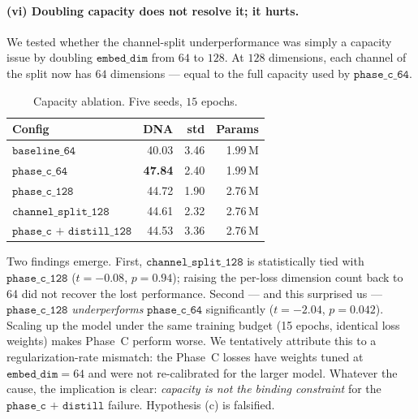 \documentclass[11pt,a4paper]{article}
\begin{document}
\paragraph{(vi) Doubling capacity does not resolve it; it hurts.}
We tested whether the channel-split underperformance was simply a
capacity issue by doubling $\texttt{embed\_dim}$ from $64$ to $128$.
At $128$ dimensions, each channel of the split now has $64$ dimensions
--- equal to the full capacity used by $\texttt{phase\_c\_64}$.

\begin{table}[h]
\centering
\caption{Capacity ablation. Five seeds, $15$ epochs.}
\label{tab:capacity}
\begin{tabular}{lrrr}
\toprule
Config & DNA & std & Params \\
\midrule
$\texttt{baseline\_64}$ & 40.03 & 3.46 & 1.99\,M \\
$\texttt{phase\_c\_64}$ & \textbf{47.84} & 2.40 & 1.99\,M \\
$\texttt{phase\_c\_128}$ & 44.72 & 1.90 & 2.76\,M \\
$\texttt{channel\_split\_128}$ & 44.61 & 2.32 & 2.76\,M \\
$\texttt{phase\_c + distill\_128}$ & 44.53 & 3.36 & 2.76\,M \\
\bottomrule
\end{tabular}
\end{table}

Two findings emerge. First, $\texttt{channel\_split\_128}$ is
statistically tied with $\texttt{phase\_c\_128}$ ($t=-0.08$,
$p=0.94$); raising the per-loss dimension count back to 64 did not
recover the lost performance. Second --- and this surprised us ---
$\texttt{phase\_c\_128}$ \emph{underperforms} $\texttt{phase\_c\_64}$
significantly ($t=-2.04$, $p=0.042$). Scaling up the model under the
same training budget (15 epochs, identical loss weights) makes Phase~C
perform worse. We tentatively attribute this to a regularization-rate
mismatch: the Phase~C losses have weights tuned at $\texttt{embed\_dim}=64$
and were not re-calibrated for the larger model. Whatever the cause,
the implication is clear: \emph{capacity is not the binding constraint}
for the $\texttt{phase\_c + distill}$ failure. Hypothesis (c) is
falsified.
\end{document}
